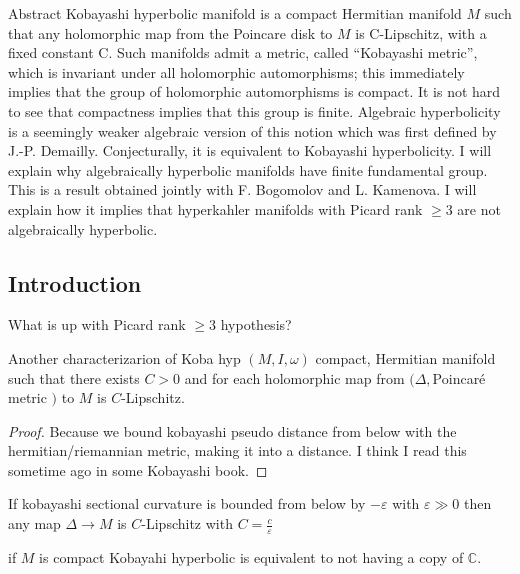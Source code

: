 \begin{thing3}{Abstract}\leavevmode
	Kobayashi hyperbolic manifold is a compact Hermitian manifold $M$
 such that any holomorphic map from the Poincare disk to $M$
 is C-Lipschitz, with a fixed constant C. Such manifolds admit a metric, called ``Kobayashi metric'', which is invariant under all holomorphic automorphisms; this immediately implies that the group of holomorphic automorphisms is compact. It is not hard to see that compactness implies that this group is finite. Algebraic hyperbolicity is a seemingly weaker algebraic version of this notion which was first defined by J.-P. Demailly. Conjecturally, it is equivalent to Kobayashi hyperbolicity. I will explain why algebraically hyperbolic manifolds have finite fundamental group. This is a result obtained jointly with F. Bogomolov and L. Kamenova. I will explain how it implies that hyperkahler manifolds with Picard rank $\geq 3$
 are not algebraically hyperbolic.
\end{thing3}

\subsection{Introduction}


\begin{question}\leavevmode
	What is up with Picard rank $\geq  3$ hypothesis?
\end{question}

\begin{thing4}{Another characterizarion of Koba hyp}\leavevmode
	$(M,I,\omega)$ compact, Hermitian manifold such that there exists $C>0$ and for each holomorphic map from $(\Delta,$Poincaré metric $)$ to $M$ is $C$-Lipschitz.
\end{thing4}
\begin{proof}\leavevmode
Because we bound kobayashi pseudo distance from below with the hermitian/riemannian metric, making it into a distance. I think I read this sometime ago in some Kobayashi book.
\end{proof}

\begin{claim}\leavevmode
	If kobayashi sectional curvature is bounded from below by $-\varepsilon$ with $\varepsilon\gg 0$ then any map $\Delta \to M$ is $C$-Lipschitz with $C=\frac{c}{\varepsilon}$
\end{claim}

\begin{thm}[Brody]\leavevmode
if $M$ is compact Kobayahi hyperbolic is equivalent to not having a copy of $\mathbb{C}$.
\end{thm}

